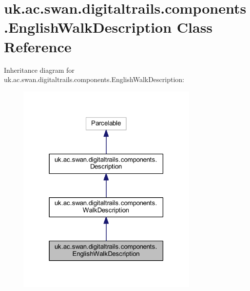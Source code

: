 \hypertarget{classuk_1_1ac_1_1swan_1_1digitaltrails_1_1components_1_1_english_walk_description}{\section{uk.\+ac.\+swan.\+digitaltrails.\+components.\+English\+Walk\+Description Class Reference}
\label{classuk_1_1ac_1_1swan_1_1digitaltrails_1_1components_1_1_english_walk_description}
}


Inheritance diagram for uk.\+ac.\+swan.\+digitaltrails.\+components.\+English\+Walk\+Description\+:\nopagebreak
\begin{figure}[H]
\begin{center}
\leavevmode
\includegraphics[width=255pt]{classuk_1_1ac_1_1swan_1_1digitaltrails_1_1components_1_1_english_walk_description__inherit__graph}
\end{center}
\end{figure}


